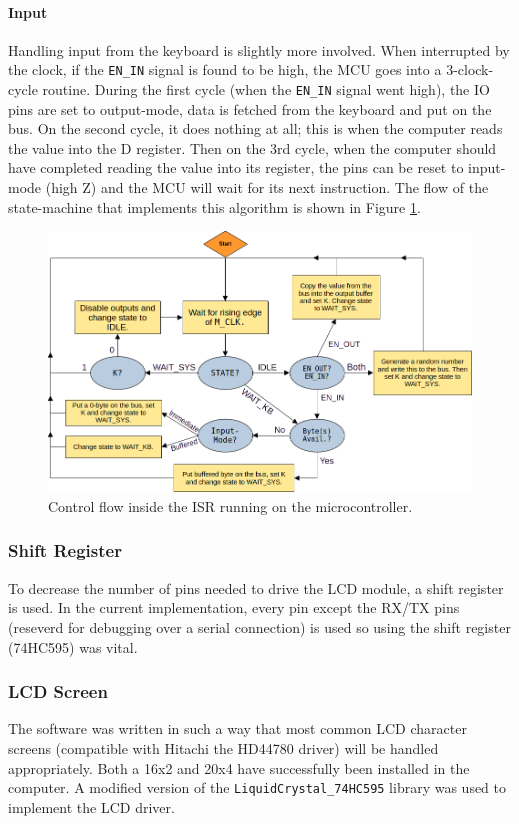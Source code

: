 \paragraph{Input} Handling input from the keyboard is slightly more involved. When interrupted by the clock, if the \texttt{EN\_IN} signal is found to be high, the MCU goes into a 3-clock-cycle routine. During the first cycle (when the \texttt{EN\_IN} signal went high), the IO pins are set to output-mode, data is fetched from the keyboard and put on the bus. On the second cycle, it does nothing at all; this is when the computer reads the value into the D register. Then on the 3rd cycle, when the computer should have completed reading the value into its register, the pins can be reset to input-mode (high Z) and the MCU will wait for its next instruction. The flow of the state-machine that implements this algorithm is shown in Figure \ref{fig:isrflow}.

\begin{figure}[H]
  \centering
  \includegraphics[width=\textwidth]{img/isrflow}
  \caption{Control flow inside the ISR running on the microcontroller.}
  \label{fig:isrflow}
\end{figure}

\subsubsection{Shift Register}
To decrease the number of pins needed to drive the LCD module, a shift register is used. In the current implementation, every pin except the RX/TX pins (reseverd for debugging over a serial connection) is used so using the shift register (74HC595) was vital.

\subsubsection{LCD Screen}
The software was written in such a way that most common LCD character screens (compatible with Hitachi the HD44780 driver) will be handled appropriately. Both a 16x2 and 20x4 have successfully been installed in the computer. A modified version of the \texttt{LiquidCrystal\_74HC595} library was used to implement the LCD driver.

